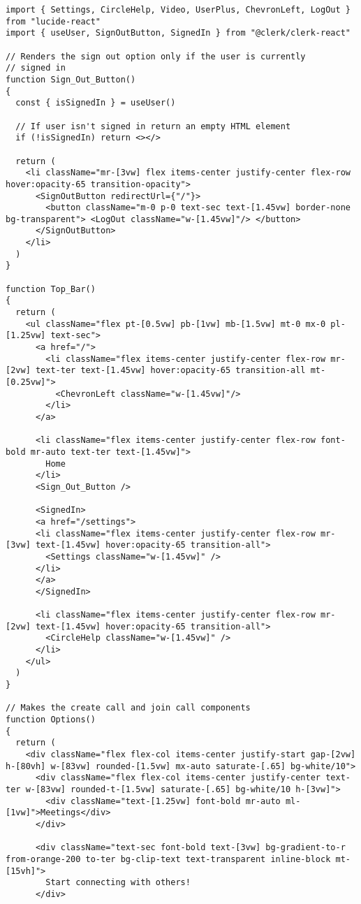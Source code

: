 \begin{verbatim}
import { Settings, CircleHelp, Video, UserPlus, ChevronLeft, LogOut } from "lucide-react"
import { useUser, SignOutButton, SignedIn } from "@clerk/clerk-react"

// Renders the sign out option only if the user is currently
// signed in
function Sign_Out_Button()
{
  const { isSignedIn } = useUser()

  // If user isn't signed in return an empty HTML element
  if (!isSignedIn) return <></>

  return (
    <li className="mr-[3vw] flex items-center justify-center flex-row hover:opacity-65 transition-opacity">
      <SignOutButton redirectUrl={"/"}>
        <button className="m-0 p-0 text-sec text-[1.45vw] border-none bg-transparent"> <LogOut className="w-[1.45vw]"/> </button>
      </SignOutButton>
    </li>
  )
}

function Top_Bar()
{
  return (
    <ul className="flex pt-[0.5vw] pb-[1vw] mb-[1.5vw] mt-0 mx-0 pl-[1.25vw] text-sec">
      <a href="/">
        <li className="flex items-center justify-center flex-row mr-[2vw] text-ter text-[1.45vw] hover:opacity-65 transition-all mt-[0.25vw]">
          <ChevronLeft className="w-[1.45vw]"/>
        </li>
      </a>

      <li className="flex items-center justify-center flex-row font-bold mr-auto text-ter text-[1.45vw]">
        Home
      </li>
      <Sign_Out_Button />

      <SignedIn>
      <a href="/settings">
      <li className="flex items-center justify-center flex-row mr-[3vw] text-[1.45vw] hover:opacity-65 transition-all">
        <Settings className="w-[1.45vw]" />
      </li>
      </a>
      </SignedIn>

      <li className="flex items-center justify-center flex-row mr-[2vw] text-[1.45vw] hover:opacity-65 transition-all">
        <CircleHelp className="w-[1.45vw]" />
      </li>
    </ul>
  )
}

// Makes the create call and join call components
function Options()
{
  return (
    <div className="flex flex-col items-center justify-start gap-[2vw] h-[80vh] w-[83vw] rounded-[1.5vw] mx-auto saturate-[.65] bg-white/10">
      <div className="flex flex-col items-center justify-center text-ter w-[83vw] rounded-t-[1.5vw] saturate-[.65] bg-white/10 h-[3vw]">
        <div className="text-[1.25vw] font-bold mr-auto ml-[1vw]">Meetings</div>
      </div>

      <div className="text-sec font-bold text-[3vw] bg-gradient-to-r from-orange-200 to-ter bg-clip-text text-transparent inline-block mt-[15vh]">
        Start connecting with others!
      </div>


\end{verbatim}
